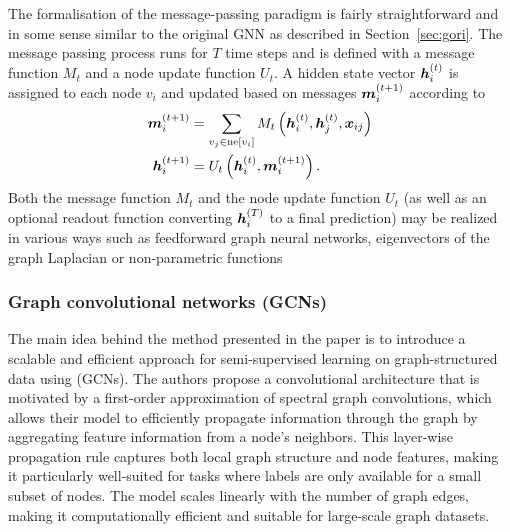 The formalisation of the message-passing paradigm is fairly straightforward and in some sense similar to the original GNN as described in Section~\ref{sec:gori}. The message passing process runs for \( T \) time steps and is defined with a message function \( M_t \) and a node update function \( U_t \). A hidden state vector \( \bm{h}_i^{(t)} \) is assigned to each node \( v_i \) and updated based on messages \( \bm{m}_i^{(t+1)} \) according to
\begin{equation}\label{eq:message-passing}
	\begin{split}
		\bm{m}_i^{(t+1)} &= \sum_{v_j \in \mathrm{ne}[v_i]} M_t \left( \bm{h}_i^{(t)}, \bm{h}_j^{(t)}, \bm{x}_{ij} \right) \\
		\bm{h}_i^{(t+1)} &= U_t \left( \bm{h}_i^{(t)}, \bm{m}_i^{(t+1)} \right). \\
	\end{split}
\end{equation}
Both the message function \( M_t \) and the node update function \( U_t \) (as well as an optional readout function converting \( \bm{h}_i^{(T)} \) to a final prediction) may be realized in various ways such as feedforward graph neural networks, eigenvectors of the graph Laplacian or non-parametric functions

\subsubsection{Graph convolutional networks (GCNs)}

The main idea behind the method presented in the paper \cite{kipf_semi-supervised_2017} is to introduce a scalable and efficient approach for semi-supervised learning on graph-structured data using  (GCNs). The authors propose a convolutional architecture that is motivated by a first-order approximation of spectral graph convolutions, which allows their model to efficiently propagate information through the graph by aggregating feature information from a node's neighbors. This layer-wise propagation rule captures both local graph structure and node features, making it particularly well-suited for tasks where labels are only available for a small subset of nodes. The model scales linearly with the number of graph edges, making it computationally efficient and suitable for large-scale graph datasets.

